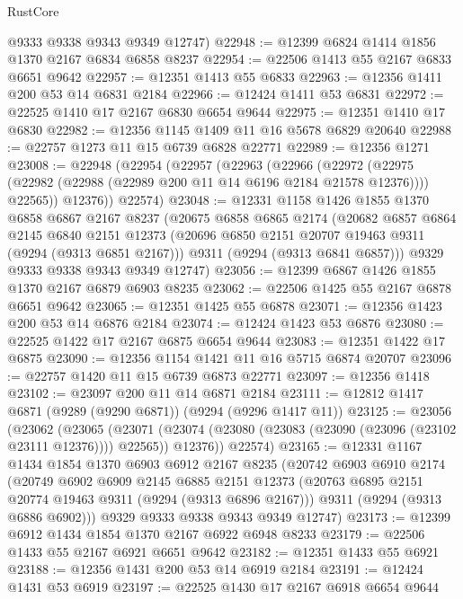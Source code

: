 \begin{lexlean}{RustCore}
\begin{coremodule}
      @9333
      @9338
      @9343
      @9349
      @12747)
@22948 := @12399 @6824 @1414 @1856 @1370 @2167 @6834 @6858 @8237
@22954 := @22506 @1413 @55 @2167 @6833 @6651 @9642
@22957 := @12351 @1413 @55 @6833
@22963 := @12356 @1411 @200 @53 @14 @6831 @2184
@22966 := @12424 @1411 @53 @6831
@22972 := @22525 @1410 @17 @2167 @6830 @6654 @9644
@22975 := @12351 @1410 @17 @6830
@22982 := @12356 @1145 @1409 @11 @16 @5678 @6829 @20640
@22988 := @22757 @1273 @11 @15 @6739 @6828 @22771
@22989 := @12356 @1271
@23008 := @22948
    (@22954
      (@22957
        (@22963
          (@22966
            (@22972
              (@22975 (@22982 (@22988 (@22989 @200 @11 @14 @6196 @2184 @21578 @12376))))
              @22565))
          @12376))
      @22574)
@23048 := @12331
    @1158
    @1426
    @1855
    @1370
    @6858
    @6867
    @2167
    @8237
    (@20675
      @6858
      @6865
      @2174
      (@20682
        @6857
        @6864
        @2145
        @6840
        @2151
        @12373
        (@20696 @6850 @2151 @20707 @19463 @9311 (@9294 (@9313 @6851 @2167)))
        @9311
        (@9294 (@9313 @6841 @6857)))
      @9329
      @9333
      @9338
      @9343
      @9349
      @12747)
@23056 := @12399 @6867 @1426 @1855 @1370 @2167 @6879 @6903 @8235
@23062 := @22506 @1425 @55 @2167 @6878 @6651 @9642
@23065 := @12351 @1425 @55 @6878
@23071 := @12356 @1423 @200 @53 @14 @6876 @2184
@23074 := @12424 @1423 @53 @6876
@23080 := @22525 @1422 @17 @2167 @6875 @6654 @9644
@23083 := @12351 @1422 @17 @6875
@23090 := @12356 @1154 @1421 @11 @16 @5715 @6874 @20707
@23096 := @22757 @1420 @11 @15 @6739 @6873 @22771
@23097 := @12356 @1418
@23102 := @23097 @200 @11 @14 @6871 @2184
@23111 := @12812 @1417 @6871 (@9289 (@9290 @6871)) (@9294 (@9296 @1417 @11))
@23125 := @23056
    (@23062
      (@23065
        (@23071 (@23074 (@23080 (@23083 (@23090 (@23096 (@23102 @23111 @12376)))) @22565)) @12376))
      @22574)
@23165 := @12331
    @1167
    @1434
    @1854
    @1370
    @6903
    @6912
    @2167
    @8235
    (@20742
      @6903
      @6910
      @2174
      (@20749
        @6902
        @6909
        @2145
        @6885
        @2151
        @12373
        (@20763 @6895 @2151 @20774 @19463 @9311 (@9294 (@9313 @6896 @2167)))
        @9311
        (@9294 (@9313 @6886 @6902)))
      @9329
      @9333
      @9338
      @9343
      @9349
      @12747)
@23173 := @12399 @6912 @1434 @1854 @1370 @2167 @6922 @6948 @8233
@23179 := @22506 @1433 @55 @2167 @6921 @6651 @9642
@23182 := @12351 @1433 @55 @6921
@23188 := @12356 @1431 @200 @53 @14 @6919 @2184
@23191 := @12424 @1431 @53 @6919
@23197 := @22525 @1430 @17 @2167 @6918 @6654 @9644

\end{coremodule}
\end{lexlean}
